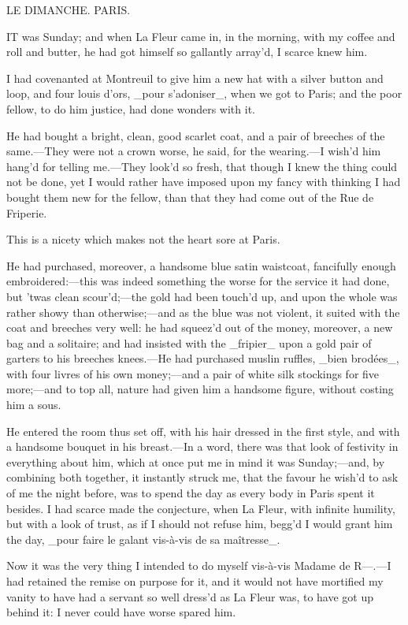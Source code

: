 \documentclass[twoside]{article}
\begin{document}
LE DIMANCHE.
PARIS.


IT was Sunday; and when La Fleur came in, in the morning, with my coffee
and roll and butter, he had got himself so gallantly array’d, I scarce
knew him.

I had covenanted at Montreuil to give him a new hat with a silver button
and loop, and four louis d’ors, _pour s’adoniser_, when we got to Paris;
and the poor fellow, to do him justice, had done wonders with it.

He had bought a bright, clean, good scarlet coat, and a pair of breeches
of the same.—They were not a crown worse, he said, for the wearing.—I
wish’d him hang’d for telling me.—They look’d so fresh, that though I
knew the thing could not be done, yet I would rather have imposed upon my
fancy with thinking I had bought them new for the fellow, than that they
had come out of the Rue de Friperie.

This is a nicety which makes not the heart sore at Paris.

He had purchased, moreover, a handsome blue satin waistcoat, fancifully
enough embroidered:—this was indeed something the worse for the service
it had done, but ’twas clean scour’d;—the gold had been touch’d up, and
upon the whole was rather showy than otherwise;—and as the blue was not
violent, it suited with the coat and breeches very well: he had squeez’d
out of the money, moreover, a new bag and a solitaire; and had insisted
with the _fripier_ upon a gold pair of garters to his breeches knees.—He
had purchased muslin ruffles, _bien brodées_, with four livres of his own
money;—and a pair of white silk stockings for five more;—and to top all,
nature had given him a handsome figure, without costing him a sous.

He entered the room thus set off, with his hair dressed in the first
style, and with a handsome bouquet in his breast.—In a word, there was
that look of festivity in everything about him, which at once put me in
mind it was Sunday;—and, by combining both together, it instantly struck
me, that the favour he wish’d to ask of me the night before, was to spend
the day as every body in Paris spent it besides.  I had scarce made the
conjecture, when La Fleur, with infinite humility, but with a look of
trust, as if I should not refuse him, begg’d I would grant him the day,
_pour faire le galant vis-à-vis de sa maîtresse_.

Now it was the very thing I intended to do myself vis-à-vis Madame de
R—.—I had retained the remise on purpose for it, and it would not have
mortified my vanity to have had a servant so well dress’d as La Fleur
was, to have got up behind it: I never could have worse spared him.
\end{document}

